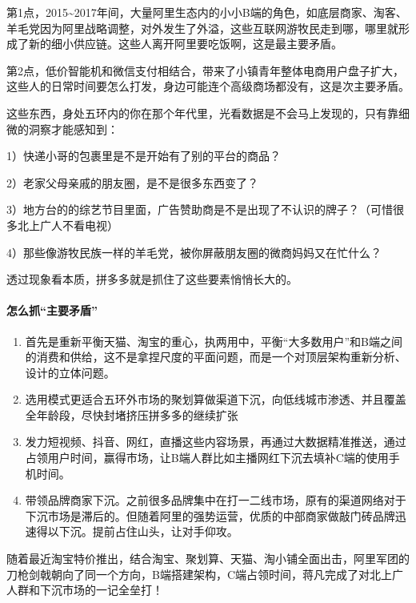 \documentclass[letterpaper,10pt,english]{sphinxmanual}
\begin{document}
第1点，2015\textasciitilde{}2017年间，大量阿里生态内的小小B端的角色，如底层商家、淘客、羊毛党因为阿里战略调整，对外发生了外溢，这些互联网游牧民走到哪，哪里就形成了新的细小供应链。这些人离开阿里要吃饭啊，这是最主要矛盾。

第2点，低价智能机和微信支付相结合，带来了小镇青年整体电商用户盘子扩大，这些人的日常时间要怎么打发，身边可能连个高级商场都没有，这是次主要矛盾。

这些东西，身处五环内的你在那个年代里，光看数据是不会马上发现的，只有靠细微的洞察才能感知到：

1）快递小哥的包裹里是不是开始有了别的平台的商品？

2）老家父母亲戚的朋友圈，是不是很多东西变了？

3）地方台的的综艺节目里面，广告赞助商是不是出现了不认识的牌子？（可惜很多北上广人不看电视）

4）那些像游牧民族一样的羊毛党，被你屏蔽朋友圈的微商妈妈又在忙什么？

透过现象看本质，拼多多就是抓住了这些要素悄悄长大的。


\paragraph{怎么抓“主要矛盾”}
\label{\detokenize{chapter_experience/taobao:id2}}\begin{enumerate}
%
\item {} 
首先是重新平衡天猫、淘宝的重心，执两用中，平衡“大多数用户”和B端之间的消费和供给，这不是拿捏尺度的平面问题，而是一个对顶层架构重新分析、设计的立体问题。

\item {} 
选用模式更适合五环外市场的聚划算做渠道下沉，向低线城市渗透、并且覆盖全年龄段，尽快封堵挤压拼多多的继续扩张

\item {} 
发力短视频、抖音、网红，直播这些内容场景，再通过大数据精准推送，通过占领用户时间，赢得市场，让B端人群比如主播网红下沉去填补C端的使用手机时间。

\item {} 
带领品牌商家下沉。之前很多品牌集中在打一二线市场，原有的渠道网络对于下沉市场是滞后的。但随着阿里的强势运营，优质的中部商家做敲门砖品牌迅速得以下沉。提前占住山头，让对手仰攻。

\end{enumerate}

随着最近淘宝特价推出，结合淘宝、聚划算、天猫、淘小铺全面出击，阿里军团的刀枪剑戟朝向了同一个方向，B端搭建架构，C端占领时间，蒋凡完成了对北上广人群和下沉市场的一记全垒打！
\end{document}
